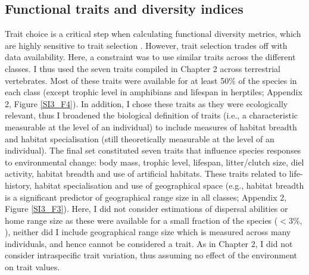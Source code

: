 \subsection{Functional traits and diversity indices}
Trait choice is a critical step when calculating functional diversity metrics, which are highly sensitive to trait selection \citep{Mouillot2021}. However, trait selection trades off with data availability. Here, a constraint was to use similar traits across the different classes. %
I thus used the seven traits compiled in Chapter 2 across terrestrial vertebrates. Most of these traits were available for at least 50\% of the species in each class (except trophic level in amphibians and lifespan in herptiles; Appendix 2, Figure \ref{SI3_F4}). In addition, I chose these traits as they were ecologically relevant, thus I broadened the biological definition of traits (i.e., a characteristic measurable at the level of an individual) to include measures of habitat breadth and habitat specialisation (still theoretically measurable at the level of an individual). The final set constituted seven traits that influence species responses to environmental change: body mass, trophic level, lifespan, litter/clutch size, diel activity, habitat breadth and use of artificial habitats. These traits related to life-history, habitat specialisation and use of geographical space (e.g., habitat breadth is a significant predictor of geographical range size in all classes; Appendix 2, Figure \ref{SI3_F3}). Here, I did not consider estimations of dispersal abilities or home range size as these were available for a small fraction of the species ($<$3\%, \cite{AlexSmith2005, Paradis1998, Sutherland2000, Whitmee2013a}), neither did I include geographical range size which is measured across many individuals, and hence cannot be considered a trait. As in Chapter 2, I did not consider intraspecific trait variation, thus assuming no effect of the environment on trait values.

